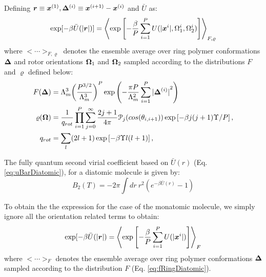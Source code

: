             Defining ${\boldsymbol {r}} \equiv {\boldsymbol {x}}^{(1)}, {\boldsymbol {\Delta}}^{(i)} \equiv {\boldsymbol {x}}^{(i+1)} - {\boldsymbol {x}}^{(i)}$ and $\bar{U}$ as:
            \begin{equation}
                \label{eq:uBarDiatomic}
                \exp [-\beta \bar{U} (|{\boldsymbol {r}}|)] = \left< \exp \left[ -\displaystyle\frac{\beta}{P} \sum_{i=1}^P U (|{\boldsymbol {x}}^i|,\Omega_1^i,\Omega_2^i) \right] \right>_{F,\varrho}
            \end{equation}
            where $<\cdots>_{F,\varrho}$ denotes the ensemble average over ring polymer conformations ${\boldsymbol {\Delta}}$ and rotor orientations ${\boldsymbol {\Omega}}_1$ and ${\boldsymbol {\Omega}}_2$ sampled according to the distributions $F$ and $\varrho$ defined below:
            \begin{subequations}
                \begin{align}
                    F({\boldsymbol {\Delta}}) &= \Lambda_m^3 { \left( \frac{P^{3/2}}{\Lambda_m^3} \right)}^P \exp \left( - \frac{\pi P}{\Lambda_m^2} \displaystyle\sum\limits_{i=1}^P {|{\boldsymbol {\Delta}}^{(i)}|}^2 \right)\label{eq:fRingDiatomic}\\
                    \varrho({\boldsymbol {\Omega}}) &= \frac{1}{q_{rot}} \displaystyle\prod_{i=1}^P \sum_{j=0}^\infty \frac{2j+1}{4 \pi} \mathcal{P}_j (cos (\theta_{i,i+1})) \exp \left[-\beta j(j+1) \Upsilon/ P \right],\label{eq:rhoDiatomic}\\
                    q_{rot} &= \displaystyle\sum_{l} (2l + 1) \exp \left[-\beta \Upsilon l (l+1) \right],\nonumber
                \end{align}
            \end{subequations}

            The fully quantum second virial coefficient based on $\bar{U} (r)$ (Eq. \eqref{eq:uBarDiatomic}), for a diatomic molecule is given by:
            \begin{equation}
            \label{eq:b2Diatomic}
                B_2 (T) = -2 \pi \displaystyle\int dr~ r^2 (e^{-\beta \bar{U} (r)} - 1)
            \end{equation}

            To obtain the the expression for the case of the monatomic molecule, we simply ignore all the orientation related terms to obtain:
            \begin{equation}
                \label{eq:uBarMonatomic}
                \exp [-\beta \bar{U} (|{\boldsymbol {r}}|) = \left< \exp \left[ -\displaystyle\frac{\beta}{P} \sum_{i=1}^P U (|{\boldsymbol {x}}^i|) \right] \right>_F
            \end{equation}
            where $<\cdots>_F$ denotes the ensemble average over ring polymer conformations ${\boldsymbol {\Delta}}$ sampled according to the distribution $F$ (Eq. \eqref{eq:fRingDiatomic}).

